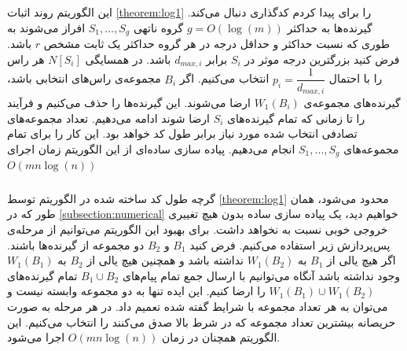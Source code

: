 \subsection{}
\subsubsection{}
این الگوریتم روند اثبات
\autoref{theorem:log1}
را برای پیدا کردم کدگذاری دنبال می‌کند. گیرنده‌ها به حداکثر
$g = O(\log(m))$
گروه ناتهی
$S_1, \ldots, S_g$
افراز می‌شوند به طوری که نسبت حداکثر و حداقل درجه در هر گروه حداکثر یک ثابت مشخص
$r$
باشد. فرض کنید بزرگترین درجه موثر در
$S_i$
برابر
$d_{max, i}$
باشد. در همسایگی
$N[S_i]$
هر راس را با احتمال
$p_i = \dfrac{1}{d_{max, i}}$
 انتخاب می‌کنیم.
 اگر
 $B_i$
 مجموعه‌ی راس‌های انتخابی باشد،
 گیرنده‌های مجموعه‌ی
 $W_1(B_i)$
 ارضا می‌شوند. این گیرنده‌ها را حذف می‌کنیم و فرآیند را تا زمانی که تمام گیرنده‌های
 $S_i$
 ارضا شوند ادامه می‌دهیم. تعداد مجموعه‌های تصادفی انتخاب شده مورد نیاز برابر طول کد خواهد بود. این کار را برای تمام مجموعه‌های
 $S_1, \ldots, S_g$
 انجام می‌دهیم. پیاده سازی ساده‌ای از این الگوریتم زمان اجرای
 $O(m n \log(n))$
 
 \subsubsection{}
 گرچه طول کد ساخته شده در الگوریتم
 توسط
 \autoref{theorem:log1}
 محدود می‌شود، همان طور که در 
 \autoref{subsection:numerical}
  خواهیم دید، یک پیاده سازی ساده بدون هیچ تغییری خروجی خوبی نسبت به
  نخواهد داشت. برای بهبود این الگوریتم می‌توانیم از مرحله‌ی پس‌پردازش زیر استفاده می‌کنیم. فرض کنید
  $B_1$
  و
  $B_2$
  دو مجموعه از گیرنده‌ها باشند. اگر هیچ یالی از
  $B_1$
  به
  $W_1(B_2)$
  نداشته باشد و همچنین هیچ یالی از
  $B_2$
  به
  $W_1(B_1)$
  وجود نداشته باشد آنگاه می‌توانیم با ارسال جمع تمام پیام‌های
  $B_1 \cup B_2$
  تمام گیرنده‌های
  $W_1(B_1) \cup W_1(B_2)$
  را ارضا کنیم. این ایده تنها به دو مجموعه وابسته نیست و می‌توان به هر تعداد مجموعه با شرایط گفته شده تعمیم داد. در هر مرحله به صورت حریصانه بیشترین تعداد مجموعه که در شرط بالا صدق می‌کنند را انتخاب می‌کنیم. این الگوریتم همچنان در زمان
  $O(m n \log(n))$
  اجرا می‌شود.
